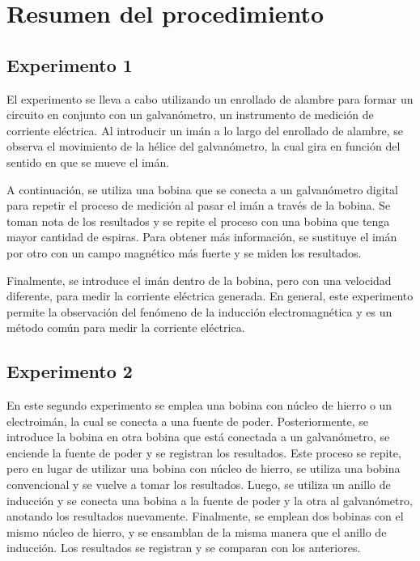 \documentclass[twocolumn, 12pt]{article}
\begin{document}
\section{Resumen del procedimiento}

\subsection*{Experimento 1}

El experimento se lleva a cabo utilizando un enrollado de
alambre para formar un circuito en conjunto con un
galvanómetro, un instrumento de medición de corriente
eléctrica. Al introducir un imán a lo largo del enrollado
de alambre, se observa el movimiento de la hélice del
galvanómetro, la cual gira en función del sentido en que se
mueve el imán.

A continuación, se utiliza una bobina que se conecta a un
galvanómetro digital para repetir el proceso de medición al
pasar el imán a través de la bobina. Se toman nota de los
resultados y se repite el proceso con una bobina que tenga
mayor cantidad de espiras. Para obtener más información, se
sustituye el imán por otro con un campo magnético más
fuerte y se miden los resultados.

Finalmente, se introduce el imán dentro de la bobina, pero
con una velocidad diferente, para medir la corriente
eléctrica generada. En general, este experimento permite la
observación del fenómeno de la inducción electromagnética y
es un método común para medir la corriente eléctrica.

\subsection*{Experimento 2}

En este segundo experimento se emplea una bobina con núcleo
de hierro o un electroimán, la cual se conecta a una fuente
de poder. Posteriormente, se introduce la bobina en otra
bobina que está conectada a un galvanómetro, se enciende la
fuente de poder y se registran los resultados. Este proceso
se repite, pero en lugar de utilizar una bobina con núcleo
de hierro, se utiliza una bobina convencional y se vuelve a
tomar los resultados. Luego, se utiliza un anillo de
inducción y se conecta una bobina a la fuente de poder y la
otra al galvanómetro, anotando los resultados nuevamente.
Finalmente, se emplean dos bobinas con el mismo núcleo de
hierro, y se ensamblan de la misma manera que el anillo de
inducción. Los resultados se registran y se comparan con
los anteriores.
\end{document}
